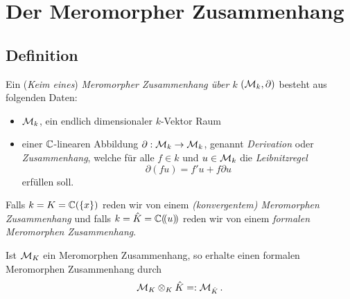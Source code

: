 
\chapter{Der Meromorpher Zusammenhang}
\begin{comment}
\begin{itemize}
\item wofür sind die gut?
\item wieso kommt man ursprünglich dazu
\end{itemize}
\end{comment}
\section{Definition}

\begin{comment}
\begin{defn}[Meromorpher Zusammenhang]
Ein (\emph{Keim eines}) \emph{Meromorpher Zusammenhang} (an $x=0$)
$(\cM_K,\partial)$ besteht aus folgenden Daten:
\begin{itemize}
\item $\cM_K$, ein endlich dimensionaler $K$-Vr
\item einer $\C$-linearen Abbildung $\partial:\cM_K\rightarrow \cM_K$,
genannt \emph{Derivation}, welche für alle $f\in K$ und $u\in \cM_K$ die
\emph{Leibnitzregel}
\begin{equation}\label{eq:Leibnitzregel}
\partial(fu)=f'u+f\partial u
\end{equation}
erfüllen soll.
\end{itemize}
\end{defn}
\end{comment}

\begin{defn}
Ein (\emph{Keim eines}) \emph{Meromorpher Zusammenhang über $k$}
$(\mathcal{M}_k,\partial)$ besteht aus folgenden Daten:
\begin{itemize}
\item $\mathcal{M}_k$, ein endlich dimensionaler $k$-Vektor Raum
\item einer $\mathbb{C}$-linearen Abbildung $\partial:\mathcal{M}_k\rightarrow \mathcal{M}_k$,
genannt \emph{Derivation} oder \emph{Zusammenhang}, welche für alle $f\in k$ und $u\in \mathcal{M}_k$ die
\emph{Leibnitzregel}
\begin{equation}\label{eq:Leibnitzregel}
\partial(fu)=f'u+f\partial u
\end{equation}
erfüllen soll.
\end{itemize}
Falls $k=K=\mathbb{C}(\{x\})$ reden wir von einem \emph{(konvergentem) Meromorphen
Zusammenhang} und falls $k=\hat K={\mathbb C (\!(u)\!)}$ reden wir von einem \emph{formalen
Meromorphen Zusammenhang}.
\end{defn}
\begin{bem}
Ist $\mathcal{M}_K$ ein Meromorphen Zusammenhang, so erhalte einen formalen
Meromorphen Zusammenhang durch
\[ \mathcal{M}_K\otimes_{K}\hat K =: \mathcal{M}_{\hat K} \,. \]
\end{bem}

